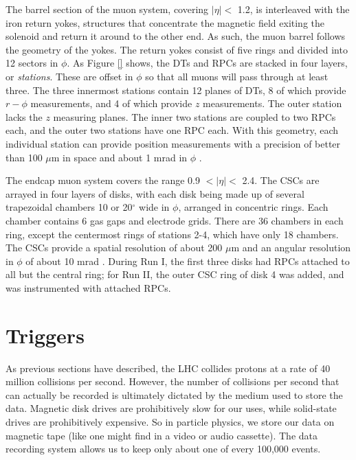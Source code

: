 The barrel section of the muon system, covering $|\eta| <$ 1.2, is
interleaved with the iron return yokes, structures that concentrate
the magnetic field exiting the solenoid and return it around to the
other end. As such, the muon barrel follows the geometry of the
yokes. The return yokes consist of five rings %
and divided into 12 sectors in $\phi$. As Figure \ref{} shows,
the DTs and RPCs are stacked in four layers, or \emph{stations}. These
are offset in $\phi$ so that all muons will pass through at least
three. The three innermost stations contain 12 planes of DTs, 8 of
which provide $r-\phi$ measurements, and 4 of which provide $z$
measurements. The outer station lacks the $z$ measuring planes. The
inner two stations are coupled to two RPCs each, and the outer two
stations have one RPC each. With this geometry, each individual
station can provide position measurements with a precision of better
than 100 $\mu$m in space and about 1 mrad in $\phi$ \cite{tdr}.

The endcap muon system covers the range 0.9 $< |\eta| <$ 2.4. The
CSCs are arrayed in four layers of disks, with each disk being made up
of several trapezoidal chambers 10 or 20$^\circ$ wide in $\phi$,
arranged in concentric rings. Each chamber contains 6 gas gaps and
electrode grids. There are 36 chambers in each ring, except the
centermost rings of stations 2-4, which have only 18 chambers. The
CSCs provide a spatial resolution of about 200 $\mu$m and an angular
resolution in $\phi$ of about 10 mrad \cite{tdr}. During Run I, the
first three disks had RPCs attached to all but the central ring; for
Run II, the outer CSC ring of disk 4 was added, and was instrumented
with attached RPCs.


\section{Triggers}
\label{sec:cms:triggers}

As previous sections have described, the LHC collides protons at a
rate of 40 million collisions per second. However, the number of
collisions per second that can actually be recorded is ultimately
dictated by the medium used to store the data. Magnetic disk drives
are prohibitively slow for our uses, while solid-state
drives are prohibitively expensive. So in particle physics, we store our data
on magnetic tape (like one might find in a video or audio
cassette). The data recording system allows us to keep only about one
of every 100,000 events.

